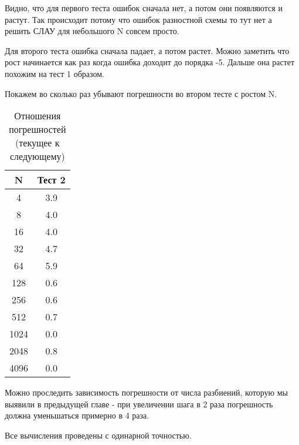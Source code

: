 Видно, что для первого теста ошибок сначала нет, а потом они появляются и растут. Так происходит потому что ошибок разностной схемы то тут нет а решить СЛАУ для небольшого N совсем просто.

Для второго теста ошибка сначала падает, а потом растет. Можно заметить что рост начинается как раз когда ошибка доходит до порядка -5. Дальше она растет похожим на тест 1 образом.

Покажем во сколько раз убывают погрешности во втором тесте с ростом N.

  \begin{table}[H]
    \centering
    \begin{tabular}{c | c}
      \toprule
      N & Тест 2 \\
      \midrule
4 & 3.9 \\
8 & 4.0 \\
16 & 4.0 \\
32 & 4.7 \\
64 & 5.9 \\
128 & 0.6 \\
256 & 0.6 \\
512 & 0.7 \\
1024 & 0.0 \\
2048 & 0.8 \\
4096 & 0.0 \\

      \bottomrule
    \end{tabular}
    \caption{Отношения погрешностей (текущее к следующему)}
  \end{table}

Можно проследить зависимость погрешности от числа разбиений, которую мы выявили в предыдущей главе - при увеличении шага в 2 раза погрешность должна уменьшаться примерно в 4 раза.

Все вычисления проведены с одинарной точностью.

